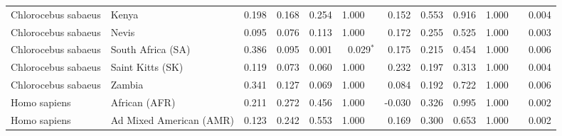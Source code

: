 \begin{center}
\begin{adjustbox}{width = 1\textwidth}
\begin{tabular}{|l|l|r|r|r|r|r|r|r|r|r|}
 Chlorocebus sabaeus &                           Kenya &                 0.198 &                                0.168 &                0.254 &                                  1.000~~ &                 0.152 &                                0.553 &                0.916 &                                  1.000~~ &              0.004 \\
 Chlorocebus sabaeus &                           Nevis &                 0.095 &                                0.076 &                0.113 &                                  1.000~~ &                 0.172 &                                0.255 &                0.525 &                                  1.000~~ &              0.003 \\
 Chlorocebus sabaeus &               South Africa (SA) &                 0.386 &                                0.095 &                0.001 &                           0.029$\bm{^*}$ &                 0.175 &                                0.215 &                0.454 &                                  1.000~~ &              0.006 \\
 Chlorocebus sabaeus &                Saint Kitts (SK) &                 0.119 &                                0.073 &                0.060 &                                  1.000~~ &                 0.232 &                                0.197 &                0.313 &                                  1.000~~ &              0.004 \\
 Chlorocebus sabaeus &                          Zambia &                 0.341 &                                0.127 &                0.069 &                                  1.000~~ &                 0.084 &                                0.192 &                0.722 &                                  1.000~~ &              0.006 \\
        Homo sapiens &                   African (AFR) &                 0.211 &                                0.272 &                0.456 &                                  1.000~~ &                -0.030 &                                0.326 &                0.995 &                                  1.000~~ &              0.002 \\
        Homo sapiens &         Ad Mixed American (AMR) &                 0.123 &                                0.242 &                0.553 &                                  1.000~~ &                 0.169 &                                0.300 &                0.653 &                                  1.000~~ &              0.002 \\

\end{tabular}
\end{adjustbox}
\end{center}
